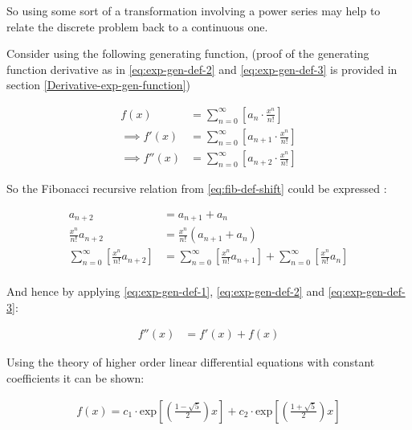 \documentclass[a4paper,11pt,twoside]{article}
\begin{document}
So using some sort of a transformation involving a power series may help to
relate the discrete problem back to a continuous one.

Consider using the following generating function, (proof of the
generating function derivative as in \eqref{eq:exp-gen-def-2} and \eqref{eq:exp-gen-def-3} is
provided in section \ref{Derivative-exp-gen-function})




\begin{align}
    f\left( x \right) &=  \sum^{\infty}_{n= 0}   \left[ a_{n} \cdot  \frac{x^n}{n!} \right]   \label{eq:exp-gen-def-1} \\
 \implies   f'\left( x \right) &=  \sum^{\infty}_{n= 0}   \left[ a_{n+1} \cdot  \frac{x^n}{n!} \right]   \label{eq:exp-gen-def-2} \\
\implies    f''\left( x \right) &=  \sum^{\infty}_{n= 0}   \left[ a_{n+2} \cdot  \frac{x^n}{n!} \right]   \label{eq:exp-gen-def-3}
\end{align}


So the Fibonacci recursive relation from \eqref{eq:fib-def-shift}  could be expressed :


\begin{align*}
a_{n+  2}    &= a_{n+  1} +  a_{n}\\
\frac{x^n}{n!}   a_{n+  2}    &= \frac{x^n}{n!}\left( a_{n+  1} +  a_{n}  \right)\\
\sum^{\infty}_{n= 0} \left[ \frac{x^n}{n!}   a_{n+  2} \right]        &= \sum^{\infty}_{n= 0}   \left[ \frac{x^n}{n!} a_{n+  1} \right]  + \sum^{\infty}_{n= 0}   \left[ \frac{x^n}{n!} a_{n}  \right]  \\
\end{align*}

And hence by applying \eqref{eq:exp-gen-def-1}, \eqref{eq:exp-gen-def-2} and \eqref{eq:exp-gen-def-3}:

\begin{align}
f''\left( x \right) &= f'\left( x \right)+  f\left( x \right)
\end{align}


Using the theory of higher order linear differential equations with
constant coefficients it can be shown:


\begin{align*}
f\left( x \right)= c_1 \cdot  \mathrm{exp}\left[ \left( \frac{1- \sqrt{5} }{2} \right)x \right] +  c_2 \cdot  \mathrm{exp}\left[ \left( \frac{1 +  \sqrt{5} }{2} \right)x \right]
\end{align*}
\end{document}

